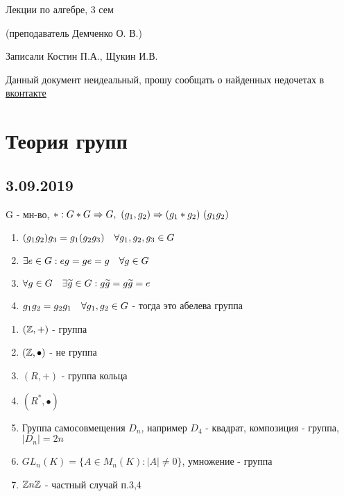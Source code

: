 \documentclass[12pt, fleqn]{article}
\begin{document}
\begin{center}
  \huge Лекции по алгебре, 3 сем
  
  \Large (преподаватель Демченко О. В.)
  
  \large Записали Костин П.А., Щукин И.В.
\end{center}

Данный документ неидеальный, прошу сообщать о найденных недочетах в \href{https://vk.com/drab_existence_a}{вконтакте}
\tableofcontents
\newpage

\section{Теория групп}
\subsection{3.09.2019}

\begin{definition}
    G - мн-во, $*:G*G \Rightarrow G,\ (g_1, g_2) \Rightarrow (g_1*g_2)\ (g_1g_2)$
    \begin{enumerate}                               
    	\item $(g_1g_2)g_3 = g_1(g_2g_3) \quad \forall g_1, g_2, g_3 \in G$
    	\item $\exists e \in G : e g = g e = g \quad \forall g \in G$
    	\item $\forall g \in G \quad \exists \widetilde{g} \in G : g\widetilde{g} = g \widetilde{g} = e$
    	\item $g_1g_2 = g_2g_1 \quad \forall g_1, g_2 \in G$ - тогда это абелева группа
	\end{enumerate} 
\end{definition}

\begin{example}
    \begin{enumerate}  
        \item $(\mathbb{Z},+)$ - группа
        \item $(\mathbb{Z}, \bullet)$ - не группа
        \item $(R, +)$ - группа кольца
        \item $(R^*, \bullet)$
        \item Группа самосовмещения $D_n$, например $D_4$ - квадрат, композиция - группа, $|D_n|=2n$
        \item $GL_n(K) = \{A \in M_n(K) : |A| \neq 0\}$, умножение - группа
        \item $\mathbb{Z} n \mathbb{Z}$ - частный случай п.3,4
    \end{enumerate} 
\end{example}
\end{document}

